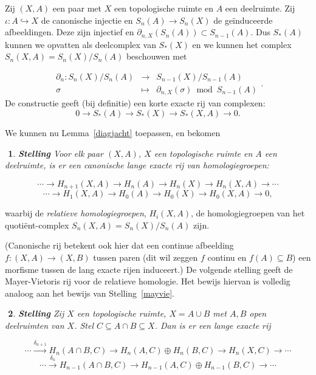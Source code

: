 \documentclass[12pt]{book}
\newtheorem{stelh}{$\!\!$}[section]
\newenvironment{stel}{\begin{stelh}{\em {\bf Stelling }}}{\end{stelh}}
\begin{document}
Zij $(X,A)$ een paar met $X$ een topologische ruimte en $A$ een deelruimte. Zij $\iota :A\hookrightarrow X$ de canonische injectie en  $S_{n}(A)\to S_{n}(X)$ de ge\"{i}nduceerde afbeeldingen. Deze zijn injectief en $\partial_{n,X}(S_{n}(A))\subset S_{n-1}(A)$. Dus $S_{*}(A)$ kunnen we opvatten als deelcomplex van
$S_{*}(X)$ en we kunnen het complex $S_{n}(X,A)=S_{n}(X)/S_{n}(A)$ beschouwen met

$$\begin{array}{rcl}
\partial_{n}:S_{n}(X)/S_{n}(A)& \to & S_{n-1}(X)/S_{n-1}(A) \\
\sigma  & \mapsto & \partial_{n,X} (\sigma)\bmod S_{n-1}(A)\end{array}.$$
De constructie geeft (bij definitie) een korte exacte rij van complexen:
$$0\to S_{*}(A)\to S_{*}(X)\to S_{*}(X,A)\to 0.$$

We kunnen nu Lemma~\ref{diagjacht} toepassen, en bekomen

\begin{stel}\label{relrij} Voor elk paar $(X,A)$, $X$ een topologische ruimte en $A$ een deelruimte, is er een
canonische lange exacte rij van homologiegroepen:

$$\cdots \to H_{n+1}(X,A)\to H_{n}(A)\to H_{n}(X)\to H_{n}(X,A)\to \cdots $$
$$\cdots \to H_{1}(X,A)\to H_{0}(A)\to H_{0}(X)\to H_{0}(X,A)\to 0,$$
\end{stel}

waarbij  de {\em relatieve homologiegroepen}, $H_{i}(X,A)$, de homologiegroepen van het
quo\-ti\"ent-complex $S_{n}(X,A)=S_{n}(X)/S_{n}(A)$ zijn.

(Canonische rij betekent ook hier dat een continue afbeelding $f:(X,A)\to (X,B)$ tussen paren (dit wil zeggen $f$ continu en $f(A)\subseteq B$) een morfisme tussen de lang exacte rijen induceert.)
De volgende stelling geeft de Mayer-Vietoris rij voor de relatieve homologie. Het bewijs hiervan is volledig analoog aan het bewijs van Stelling~\ref{mayvie}.

\begin{stel} Zij $X$ een topologische ruimte, $X=A\cup B$ met $A,B$ open deelruimten van $X$.
Stel $C\subseteq A\cap B\subseteq X$. Dan is er een lange exacte rij

$$\cdots \stackrel{\delta_{n+1}}{\to} H_{n}(A\cap B, C)\to H_{n}(A,C)\oplus H_{n}(B,C)\to
H_{n}(X,C)\to \cdots$$
$$\cdots \stackrel{\delta_{n}}{\to} H_{n-1}(A\cap B, C)\to H_{n-1}(A,C)\oplus H_{n-1}(B,C)\to
\cdots$$
\end{stel}
\end{document}
